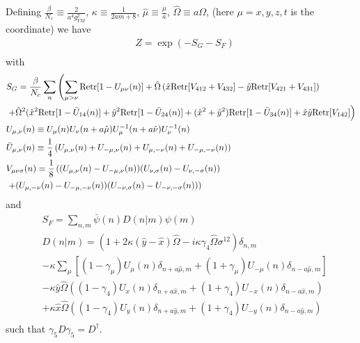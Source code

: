 Defining $\frac{\beta}{N_c} \equiv \frac{2}{a^4g_{YM}^2}$, $\kappa \equiv \frac{1}{2am+8}$, $\hat{\mu}\equiv \frac{\mu}{a}$, $\hat{\Omega}\equiv a\Omega$, (here $\mu=x,y,z,t$ is the coordinate) we have
\begin{equation}
\begin{split}
&Z=\exp (-S_G-S_F)\\
\end{split}
\end{equation}
with
\textcolor[rgb]{0,0,0.8}{
\begin{equation}
\begin{split}
&S_G=\frac{\beta}{N_c}\sum _{n}\left(\sum _{\mu >\nu}{\rm Retr}[1-U_{\mu\nu}(n)]+\hat{\Omega}\left(\hat{x}{\rm Retr}[V_{412}+V_{432}]-\hat{y}{\rm Retr}[V_{421}+V_{431}]\right)\right.\\
&\left.+\hat{\Omega}^2(\hat{x}^2{\rm Retr}[1-\bar{U}_{14}(n)]+\hat{y}^2{\rm Retr}[1-\bar{U}_{24}(n)]+(\hat{x}^2+\hat{y}^2){\rm Retr}[1-\bar{U}_{34}(n)]+\hat{x}\hat{y}{\rm Retr}[V_{142}]\right)\\
&U_{\mu, \nu}(n)\equiv U_{\mu}(n)U_{\nu}(n+a\hat{\mu})U^{-1}_{\mu}(n+a\hat{\nu})U^{-1}_{\nu}(n)\\
&\bar{U}_{\mu, \nu}(n)\equiv \frac{1}{4}\left(U_{\mu, \nu}(n)+U_{-\mu ,\nu}(n)+U_{\mu, -\nu}(n)+U_{-\mu, -\nu}(n)\right)\\
&V_{\mu\nu\sigma}(n)=\frac{1}{8}\left((U_{\mu,\nu}(n)-U_{-\mu,\nu}(n))(U_{\nu,\sigma}(n)-U_{\nu,-\sigma}(n))\right.\\
&\left.+(U_{\mu,-\nu}(n)-U_{-\mu,-\nu}(n))(U_{-\nu,\sigma}(n)-U_{-\nu,-\sigma}(n))\right)\\
\end{split}
\end{equation}
}
and
\textcolor[rgb]{0,0,0.8}{
\begin{equation}
\begin{split}
&S_F=\sum _{n,m}\bar{\psi }(n) D(n|m) \psi(m)\\
&D(n|m)=\left(1+2\kappa(\hat{y}-\hat{x})\hat{\Omega}-i\kappa \gamma _4 \hat{\Omega} \sigma ^{12}\right)\delta _{n,m}\\
&-\kappa\sum _{\mu}\left[(1-\gamma _{\mu})U_{\mu}(n)\delta _{n+a\hat{\mu},m}+(1+\gamma _{\mu})U_{-\mu}(n)\delta _{n-a\hat{\mu},m}\right]\\
&-\kappa \hat{y}\hat{\Omega} \left((1-\gamma _4)U_{x}(n)\delta _{n+a\hat{x},m}+(1+\gamma _4)U_{-x}(n)\delta _{n-a\hat{x},m}\right)\\
&+\kappa \hat{x}\hat{\Omega} \left((1-\gamma _4)U_{y}(n)\delta _{n+a\hat{y},m}+(1+\gamma _4)U_{-y}(n)\delta _{n-a\hat{y},m}\right)\\
\end{split}
\end{equation}
}
such that $\gamma _5 D \gamma _5=D^{\dagger}$.

